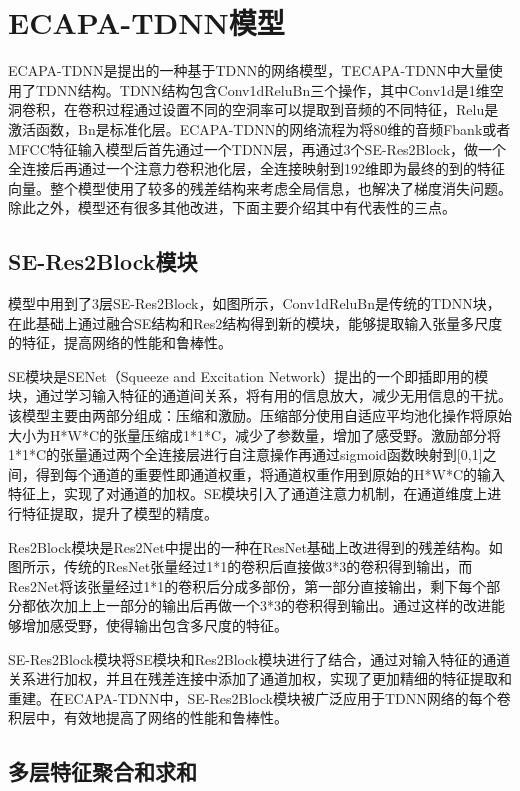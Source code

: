\chapter{ECAPA-TDNN模型}
ECAPA-TDNN是提出的一种基于TDNN的网络模型，TECAPA-TDNN中大量使用了TDNN结构。TDNN结构包含Conv1dReluBn三个操作，其中Conv1d是1维空洞卷积，在卷积过程通过设置不同的空洞率可以提取到音频的不同特征，Relu是激活函数，Bn是标准化层。ECAPA-TDNN的网络流程为将80维的音频Fbank或者MFCC特征输入模型后首先通过一个TDNN层，再通过3个SE-Res2Block，做一个全连接后再通过一个注意力卷积池化层，全连接映射到192维即为最终的到的特征向量。整个模型使用了较多的残差结构来考虑全局信息，也解决了梯度消失问题。除此之外，模型还有很多其他改进，下面主要介绍其中有代表性的三点。

\section{SE-Res2Block模块}
模型中用到了3层SE-Res2Block，如图所示，Conv1dReluBn是传统的TDNN块，在此基础上通过融合SE结构和Res2结构得到新的模块，能够提取输入张量多尺度的特征，提高网络的性能和鲁棒性。

SE模块是SENet（Squeeze and Excitation Network）提出的一个即插即用的模块，通过学习输入特征的通道间关系，将有用的信息放大，减少无用信息的干扰。该模型主要由两部分组成：压缩和激励。压缩部分使用自适应平均池化操作将原始大小为H*W*C的张量压缩成1*1*C，减少了参数量，增加了感受野。激励部分将1*1*C的张量通过两个全连接层进行自注意操作再通过sigmoid函数映射到[0,1]之间，得到每个通道的重要性即通道权重，将通道权重作用到原始的H*W*C的输入特征上，实现了对通道的加权。SE模块引入了通道注意力机制，在通道维度上进行特征提取，提升了模型的精度。

Res2Block模块是Res2Net中提出的一种在ResNet基础上改进得到的残差结构。如图所示，传统的ResNet张量经过1*1的卷积后直接做3*3的卷积得到输出，而Res2Net将该张量经过1*1的卷积后分成多部份，第一部分直接输出，剩下每个部分都依次加上上一部分的输出后再做一个3*3的卷积得到输出。通过这样的改进能够增加感受野，使得输出包含多尺度的特征。

SE-Res2Block模块将SE模块和Res2Block模块进行了结合，通过对输入特征的通道关系进行加权，并且在残差连接中添加了通道加权，实现了更加精细的特征提取和重建。在ECAPA-TDNN中，SE-Res2Block模块被广泛应用于TDNN网络的每个卷积层中，有效地提高了网络的性能和鲁棒性。

\section{多层特征聚合和求和}

